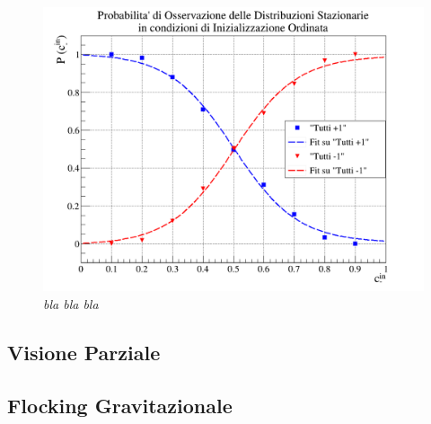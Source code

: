 \documentclass{article}
\begin{document}
\begin{figure}[h]
\centering
\includegraphics[width = \linewidth]{fixed_prob_graph.png}
\caption{\textit{bla bla bla}}
\label{Fig:9}
\end{figure}


\subsection{Visione Parziale}
\label{Sec:4.2}

\subsection{Flocking Gravitazionale}
\label{Sec:4.3}
\end{document}
